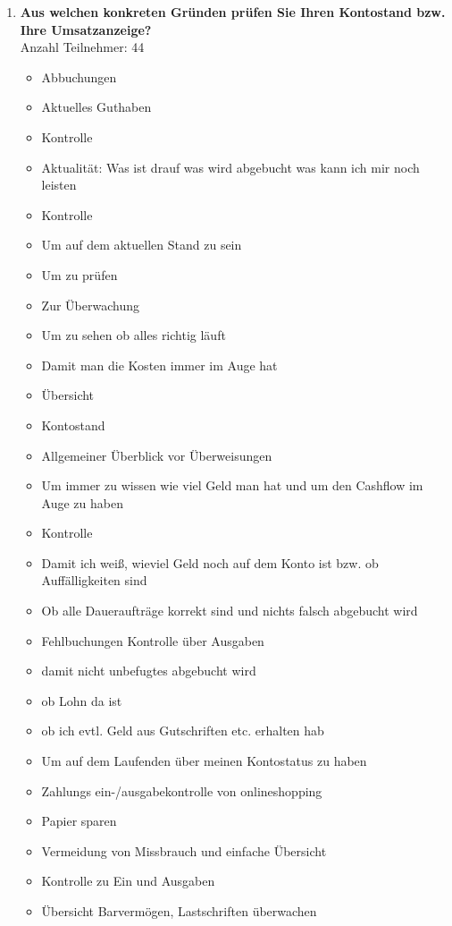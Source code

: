 \begin{enumerate}
     \item \textbf{Aus welchen konkreten Gründen prüfen Sie Ihren Kontostand bzw. Ihre Umsatzanzeige?}\\ Anzahl Teilnehmer: 44
     \begin{itemize}
        \item Abbuchungen
        \item Aktuelles Guthaben
        \item Kontrolle
        \item Aktualität: Was ist drauf was wird abgebucht was kann ich mir noch leisten
        \item Kontrolle
        \item Um auf dem aktuellen Stand zu sein
        \item Um zu prüfen
        \item Zur Überwachung
        \item Um zu sehen ob alles richtig läuft
        \item Damit man die Kosten immer im Auge hat
        \item Übersicht
        \item Kontostand
        \item Allgemeiner Überblick vor Überweisungen
        \item Um immer zu wissen wie viel Geld man hat und um den Cashflow im Auge zu haben
        \item Kontrolle
        \item Damit ich weiß, wieviel Geld noch auf dem Konto ist bzw. ob Auffälligkeiten sind
        \item Ob alle Daueraufträge korrekt sind und nichts falsch abgebucht wird
        \item Fehlbuchungen Kontrolle über Ausgaben
        \item damit nicht unbefugtes abgebucht wird
        \item ob Lohn da ist
        \item ob ich evtl. Geld aus Gutschriften etc. erhalten hab
        \item Um auf dem Laufenden über meinen Kontostatus zu haben
        \item Zahlungs ein-/ausgabekontrolle von onlineshopping
        \item Papier sparen
        \item Vermeidung von Missbrauch und einfache Übersicht
        \item Kontrolle zu Ein und Ausgaben
        \item Übersicht Barvermögen, Lastschriften überwachen

\end{itemize}
\end{enumerate}
